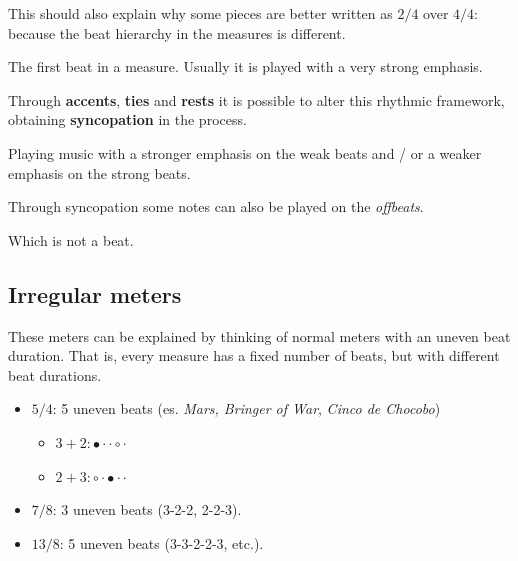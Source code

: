 This should also explain why some pieces are better written as $2/4$ over $4/4$: because the beat hierarchy in the measures is different.

\begin{definition}[Downbeat]
    The first beat in a measure. Usually it is played with a very strong emphasis.
\end{definition}

Through \textbf{accents}, \textbf{ties} and \textbf{rests} it is possible to alter this rhythmic framework, obtaining \textbf{syncopation} in the process.

\begin{definition}[Syncopation]
    Playing music with a stronger emphasis on the weak beats and / or a weaker emphasis on the strong beats.
\end{definition}

Through syncopation some notes can also be played on the \emph{offbeats}.

\begin{definition}[Offbeat]
    Which is not a beat.
\end{definition}

\subsection{Irregular meters}
These meters can be explained by thinking of normal meters with an uneven beat duration. That is, every measure has a fixed number of beats, but with different beat durations.

\begin{itemize}
    \item $5/4$: 5 uneven beats (es. \emph{Mars, Bringer of War}, \emph{Cinco de Chocobo})
    \begin{itemize}
        \item $3+2: \bullet \cdot \cdot \circ \cdot$
        \item $2+3: \circ \cdot \bullet \cdot \cdot$
    \end{itemize}
    \item $7/8$: 3 uneven beats (3-2-2, 2-2-3).
    \item $13/8$: 5 uneven beats (3-3-2-2-3, etc.).
\end{itemize}